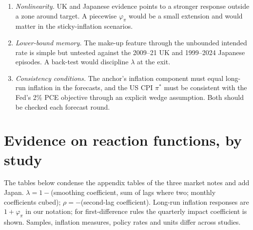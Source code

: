 \documentclass[11pt,a4paper]{article}
\newcommand{\pis}{\pi^{*}}
\begin{document}
\begin{enumerate}
\item \emph{Nonlinearity.} UK and Japanese evidence points to a stronger response outside a zone around target. A piecewise $\varphi_\pi$ would be a small extension and would matter in the sticky-inflation scenarios.
\item \emph{Lower-bound memory.} The make-up feature through the unbounded intended rate is simple but untested against the 2009--21 UK and 1999--2024 Japanese episodes. A back-test would discipline $\lambda$ at the exit.
\item \emph{Consistency conditions.} The anchor's inflation component must equal long-run inflation in the forecasts, and the US CPI $\pis$ must be consistent with the Fed's 2\% PCE objective through an explicit wedge assumption. Both should be checked each forecast round.
\end{enumerate}

\appendix

\section{Evidence on reaction functions, by study}
\label{app:evidence}

The tables below condense the appendix tables of the three market notes and add Japan. $\lambda = 1-$(smoothing coefficient, sum of lags where two; monthly coefficients cubed); $\rho = -$(second-lag coefficient). Long-run inflation responses are $1+\varphi_\pi$ in our notation; for first-difference rules the quarterly impact coefficient is shown. Samples, inflation measures, policy rates and units differ across studies.
\end{document}
